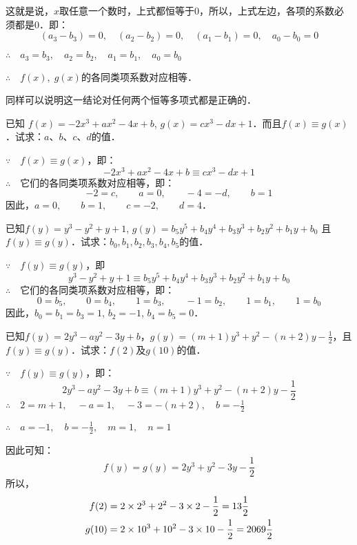 这就是说，$x$取任意一个数时，上式都恒等于0，所以，上式左边，各项的系数必须都是0．即：
\[(a_3-b_3)=0,\quad (a_2-b_2)=0,\quad (a_1-b_1)=0,\quad a_0 -b_0= 0  \]

$\therefore\quad a_3=b_3,\quad a_2=b_2,\quad a_1=b_1,\quad a_0=b_0$

$\therefore\quad f(x),\; g(x)$的各同类项系数对应相等．

同样可以说明这一结论对任何两个恒等多项式都是正确的．

\begin{example}
    已知 $f(x)=-2x^3+ax^2-4x+b$, $g(x)=cx^3-dx+1$．而且$f(x)\equiv g(x)$．试求：$a$、$b$、$c$、$d$的值．
\end{example}

\begin{solution}
    $\because\quad f(x)\equiv g(x)$，即：
\[-2x^3+ax^2-4x+b\equiv cx^3-dx+1\]
$\therefore\quad $它们的各同类项系数对应相等，即： 
\[-2=c,\qquad a=0,\qquad -4=-d,\qquad b=1\]
因此，$a=0,\qquad b=1,\qquad c=-2,\qquad d=4$．
\end{solution}

\begin{example}
    已知$f(y)=y^3-y^2+y+1$, $g(y)=b_5y^5+b_4y^4+b_3y^3+b_2y^2+b_1y+b_0$ 且$f(y)\equiv g(y)$．试求：$b_0,b_1,b_2,b_3,b_4,b_5$的值．
\end{example}


\begin{solution}
$\because\quad f(y)\equiv g(y)$，即
\[y^3-y^2+y+1\equiv b_5y^5+b_4y^4+b_3y^3+b_2y^2+b_1y+b_0 \]
$\therefore\quad $它们的各同类项系数对应相等，即：
\[0=b_5,\qquad 0=b_4,\qquad 1=b_3,\qquad -1=b_2,\qquad 1=b_1,\qquad
1=b_0\]
 因此，$b_0=b_1=b_3=1$, $b_2=-1$, $b_4=b_5=0$．   
\end{solution}

\begin{example}
   已知$f(y)=2y^3-ay^2-3y+b$，$g(y)=(m+1)y^3+y^2-(n+2)y-\frac{1}{2}$，且$f(y)\equiv g(y)$．试求：$f(2)$及$g(10)$的值． 
\end{example}

\begin{solution}
$\because\quad f(y)\equiv g(y)$，即：
\[2y^3-ay^2-3y+b\equiv (m+1)y^3+y^2-(n+2)y-\frac{1}{2} \]
$\therefore\quad 2=m+1,\quad -a=1,\quad -3=-(n+2),\quad b=-\frac{1}{2}$

$\therefore\quad a=-1,\quad b=-\frac{1}{2},\quad m=1,\quad n=1$

因此可知：
\[f(y)=g(y)=2y^3+y^2-3y-\frac{1}{2} \]
所以，
\[\begin{split}
    f(2)&= 2\times 2^3+2^2-3\times 2-\dfrac{1}{2}=13\dfrac{1}{2}\\
    g(10)&=2\times 10^3+10^2-3\times 10-\dfrac{1}{2}=2069\dfrac{1}{2} 
\end{split}\]
\end{solution}

